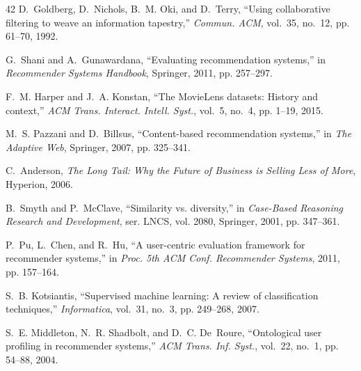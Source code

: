 \documentclass[12pt,a4paper]{report}
\begin{document}
\begin{thebibliography}{42}
D.~Goldberg, D.~Nichols, B.~M. Oki, and D.~Terry, ``Using collaborative filtering to weave an information tapestry,'' \emph{Commun. ACM}, vol.~35, no.~12, pp. 61--70, 1992.

G.~Shani and A.~Gunawardana, ``Evaluating recommendation systems,'' in \emph{Recommender Systems Handbook}, Springer, 2011, pp. 257--297.

F.~M. Harper and J.~A. Konstan, ``The MovieLens datasets: History and context,'' \emph{ACM Trans. Interact. Intell. Syst.}, vol.~5, no.~4, pp. 1--19, 2015.

M.~S. Pazzani and D.~Billsus, ``Content-based recommendation systems,'' in \emph{The Adaptive Web}, Springer, 2007, pp. 325--341.

C.~Anderson, \emph{The Long Tail: Why the Future of Business is Selling Less of More}, Hyperion, 2006.

B.~Smyth and P.~McClave, ``Similarity vs. diversity,'' in \emph{Case-Based Reasoning Research and Development}, ser. LNCS, vol. 2080, Springer, 2001, pp. 347--361.

P.~Pu, L.~Chen, and R.~Hu, ``A user-centric evaluation framework for recommender systems,'' in \emph{Proc. 5th ACM Conf. Recommender Systems}, 2011, pp. 157--164.

S.~B. Kotsiantis, ``Supervised machine learning: A review of classification techniques,'' \emph{Informatica}, vol.~31, no.~3, pp. 249--268, 2007.

S.~E. Middleton, N.~R. Shadbolt, and D.~C. De~Roure, ``Ontological user profiling in recommender systems,'' \emph{ACM Trans. Inf. Syst.}, vol.~22, no.~1, pp. 54--88, 2004.

\end{thebibliography}
\end{document}
